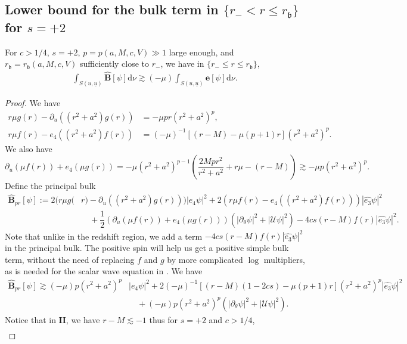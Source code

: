 \documentclass[reqno]{amsart}
\numberwithin{equation}{section}
\newcommand{\intS}{\int_{S(u,\ubar)}}
\newcommand{\ubar}{{\underline{u}}}
\newcommand{\dee}{\mathrm{d}}
\newcommand{\ener}{\mathbf{e}}
\newcommand{\ethat}{\widehat{e_3}}
\newcommand{\deux}{\mathbf{II}}
\newcommand{\rb}{r_\mathfrak{b}}
\theoremstyle{plain}
\theoremstyle{definition}
\theoremstyle{remark}
\numberwithin{equation}{section}
\begin{document}
\subsection{Lower bound for the bulk term in $\{r_-<r\leq\rb\}$ for $s=+2$}\label{appendix:bulkII}
\begin{lem}\label{lem:posbulkII}
    For $c>1/4$, $s=+2$, $p=p(a,M,c,V)\gg 1$ large enough, and $\rb=\rb(a,M,c,V)$ sufficiently close to $r_-$, we have in $\{r_-\leq r\leq\rb\}$,
    \begin{align}\label{eqn:bulkIIpos}
    \intS\widehat{\mathbf{B}}[\psi]\dee\nu\gtrsim(-\mu)\intS{\ener}[\psi]\dee\nu.
\end{align}
\end{lem}
\begin{proof}
We have 
\begin{align*}
    r \mu g(r)-\partial_u\left(\left(r^2+a^2\right) g(r)\right)  &=-\mu p r\left(r^2+a^2\right)^p, \\
r \mu f(r)-e_4\left(\left(r^2+a^2\right) f(r)\right)  &=(-\mu)^{-1}[(r-M)-\mu(p+1) r]\left(r^2+a^2\right)^p.
\end{align*}
We also have
$$\partial_u(\mu f(r))+e_4(\mu g(r))  =-\mu\left(r^2+a^2\right)^{p-1}\left(\dfrac{2 M p r^2}{r^2+a^2}+r \mu-(r-M)\right)\gtrsim -\mu p(r^2+a^2)^p.
$$ 
Define the principal bulk
\begin{align*}
    \widehat{\mathbf{B}}_{pr}[\psi]:=2(r\mu g(&r)-\partial_u((r^2+a^2)g(r)))|e_4\psi|^2+2(r\mu f(r)-e_4((r^2+a^2)f(r)))|\ethat\psi|^2\\
    &\quad +\dfrac{1}{2}(\partial_u(\mu f(r))+e_4(\mu g(r)))(|\partial_\theta\psi|^2+|\mathcal{U}\psi|^2)-4cs(r-M)f(r)|\ethat\psi|^2.
\end{align*}
Note that unlike in the redshift region, we add a term $-4cs(r-M)f(r)|\ethat\psi|^2$ in the principal bulk. The positive spin will help us get a positive simple bulk term, without the need of replacing $f$ and $g$ by more complicated $\log$ multipliers, as is needed for the scalar wave equation in \cite[p. 22]{scalarMZ}. We have
\begin{align*}
    \widehat{\mathbf{B}}_{pr}[\psi]\gtrsim (-\mu)p(r^2+a^2)^p&|e_4\psi|^2+2(-\mu)^{-1}[(r-M)(1-2cs)-\mu(p+1) r]\left(r^2+a^2\right)^p|\ethat\psi|^2\\
    &\quad +(-\mu)p(r^2+a^2)^p(|\partial_\theta\psi|^2+|\mathcal{U}\psi|^2).
\end{align*}
Notice that in $\deux$, we have $r-M\lesssim -1$ thus for $s=+2$ and $c>1/4$,
\begin{align}\label{eqn:use1/4}

\end{align}
\end{proof}
\end{document}
